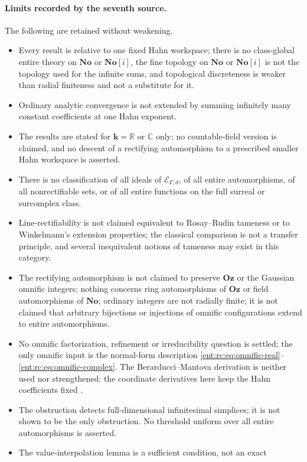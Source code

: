 \documentclass[11pt]{article}
\theoremstyle{plain}
\theoremstyle{plain}
\theoremstyle{plain}
\theoremstyle{definition}
\theoremstyle{definition}
\theoremstyle{definition}
\theoremstyle{definition}
\theoremstyle{remark}
\newcommand{\C}{\mathbb C}\newcommand{\R}{\mathbb R}
\newcommand{\No}{\mathbf{No}}
\newcommand{\kk}{\mathbf k}\newcommand{\PP}{\mathbb P}
\newcommand{\Oz}{\mathbf{Oz}}\newcommand{\Ed}{\mathcal E_{\Gamma,d}}
\begin{document}
\paragraph{Limits recorded by the seventh source.}
The following are retained without weakening.
\begin{itemize}[leftmargin=1.4em]
\item Every result is relative to one fixed Hahn workspace; there is no
class-global entire theory on $\No$ or $\No[i]$, the fine topology on $\No$ or
$\No[i]$ is not the topology used for the infinite sums, and topological
discreteness is weaker than radial finiteness and not a substitute for it.
\item Ordinary analytic convergence is not extended by summing infinitely many
constant coefficients at one Hahn exponent.
\item The results are stated for $\kk=\R$ or $\C$ only; no countable-field
version is claimed, and no descent of a rectifying automorphism to a
prescribed smaller Hahn workspace is asserted.
\item There is no classification of all ideals of $\Ed$, of all entire
automorphisms, of all nonrectifiable sets, or of all entire functions on the
full surreal or surcomplex class.
\item Line-rectifiability is not claimed equivalent to Rosay--Rudin tameness or
to Winkelmann's extension properties; the classical comparison is not a
transfer principle, and several inequivalent notions of tameness may exist in
this category.
\item The rectifying automorphism is not claimed to preserve $\Oz$ or the
Gaussian omnific integers; nothing concerns ring automorphisms of $\Oz$ or
field automorphisms of $\No$; ordinary integers are not radially finite; it
is not claimed that arbitrary bijections or injections of omnific
configurations extend to entire automorphisms.
\item No omnific factorization, refinement or irreducibility question
\cite{LInnocenteMantova} is settled; the only omnific input is the normal-form
description \eqref{ent:rc:eq:omnific-real}--\eqref{ent:rc:eq:omnific-complex}.
The Berarducci--Mantova derivation is neither used nor strengthened: the
coordinate derivatives here keep the Hahn coefficients fixed
\cite{MantovaMatusinski}.
\item The obstruction detects full-dimensional infinitesimal simplices; it is
not shown to be the only obstruction. No threshold uniform over all entire
automorphisms is asserted.
\item The value-interpolation lemma is a sufficient condition, not an exact

\end{itemize}
\end{document}
